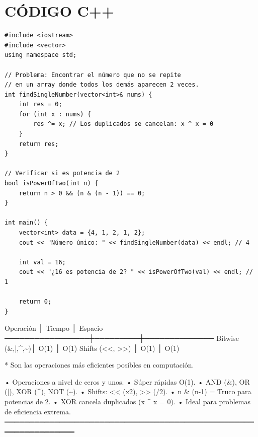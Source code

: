 \section*{CÓDIGO C++}
\hrulefill
\begin{lstlisting}
#include <iostream>
#include <vector>
using namespace std;

// Problema: Encontrar el número que no se repite
// en un array donde todos los demás aparecen 2 veces.
int findSingleNumber(vector<int>& nums) {
    int res = 0;
    for (int x : nums) {
        res ^= x; // Los duplicados se cancelan: x ^ x = 0
    }
    return res;
}

// Verificar si es potencia de 2
bool isPowerOfTwo(int n) {
    return n > 0 && (n & (n - 1)) == 0;
}

int main() {
    vector<int> data = {4, 1, 2, 1, 2};
    cout << "Número único: " << findSingleNumber(data) << endl; // 4
    
    int val = 16;
    cout << "¿16 es potencia de 2? " << isPowerOfTwo(val) << endl; // 1
    
    return 0;
}
\end{lstlisting}
\begin{dsacomplejidad}
Operación        │ Tiempo  │ Espacio
  ─────────────────┼─────────┼──────────────
  Bitwise (\&,|,\textasciicircum{},\textasciitilde{})│ O(1)    │ O(1)
  Shifts (<<, >>)  │ O(1)    │ O(1)

* Son las operaciones más eficientes posibles en computación.
\end{dsacomplejidad}
\begin{dsaentrevistas}

\end{dsaentrevistas}
\begin{dsaresumen}
• Operaciones a nivel de ceros y unos.
• Súper rápidas O(1).
• AND (\&), OR (|), XOR (\textasciicircum{}), NOT (\textasciitilde{}).
• Shifts: << (x2), >> (/2).
• n \& (n-1) = Truco para potencias de 2.
• XOR cancela duplicados (x \textasciicircum{} x = 0).
• Ideal para problemas de eficiencia extrema.
════════════════════════════════════════════════════════════════
\end{dsaresumen}


